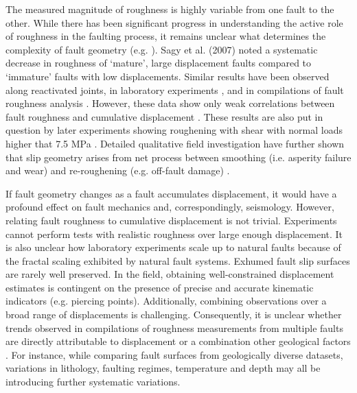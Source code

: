 \documentclass[12pt,a4paper]{article}
\begin{document}
The measured magnitude of roughness is highly variable from one fault to the other. While there has been significant progress in understanding the active role of roughness in the faulting process, it remains unclear what determines the complexity of fault geometry (e.g. \cite{candela2012roughness, brodsky2016constraints}). Sagy et al. (2007) noted a systematic decrease in roughness of ‘mature’, large displacement faults compared to ‘immature’ faults with low displacements. Similar results have been observed along reactivated joints, in laboratory experiments \cite{davidesko2014evolution}, and in compilations of fault roughness analysis \cite{brodsky2011faults, candela2009characterization}. However, these data show only weak correlations between fault roughness and cumulative displacement \cite{brodsky2011faults, candela2012roughness}. These results are also put in question by later experiments showing roughening with shear with normal loads higher that 7.5 MPa \cite{badt2016geometrical}. Detailed qualitative field investigation have further shown that slip geometry arises from net process between smoothing (i.e. asperity failure and wear) and re-roughening (e.g. off-fault damage) \cite{shervais2016smoothing}.

If fault geometry changes as a fault accumulates displacement, it would have a profound effect on fault mechanics and, correspondingly, seismology. However, relating fault roughness to cumulative displacement is not trivial. Experiments cannot perform tests with realistic roughness over large enough displacement. It is also unclear how laboratory experiments scale up to natural faults because of the fractal scaling exhibited by natural fault systems. Exhumed fault slip surfaces are rarely well preserved. In the field, obtaining well-constrained displacement estimates is contingent on the presence of precise and accurate kinematic indicators (e.g. piercing points). Additionally, combining observations over a broad range of displacements is challenging. Consequently, it is unclear whether trends observed in compilations of roughness measurements from multiple faults are directly attributable to displacement or a combination other geological factors \cite{brodsky2011faults}. For instance, while comparing fault surfaces from geologically diverse datasets, variations in lithology, faulting regimes, temperature and depth may all be introducing further systematic variations. 
\end{document}
